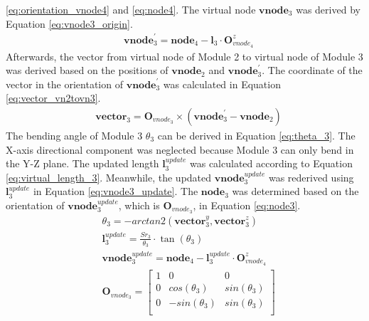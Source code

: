 \begin{itemize}
    \ref{eq:orientation_vnode4} and \ref{eq:node4}. The virtual node $\textbf{vnode}_{3}$ was derived by Equation 
    \ref{eq:vnode3_origin}.
    \vspace{-5mm}
    \begin{align}
        &\textbf{vnode}_{3}^{'} = \textbf{node}_{4} - \textbf{l}_{3} \cdot \textbf{O}_{vnode_4}^{z}
        \label{eq:vnode3_origin}
    \end{align}
    Afterwards, the vector from virtual node of Module 2 to virtual node of Module 3 was derived based on the 
    positions of $\textbf{vnode}_{2}$ and $\textbf{vnode}_{3}^{'}$. The coordinate of the vector in the orientation 
    of $\textbf{vnode}_{3}^{'}$ was calculated in Equation \ref{eq:vector_vn2tovn3}. 
    \vspace{-5mm}
    \begin{align}
        &\textbf{vector}_{3} = \textbf{O}_{vnode_3} \times (\textbf{vnode}_{3}^{'} - \textbf{vnode}_{2}) 
        \label{eq:vector_vn2tovn3} 
    \end{align}
    The bending angle of Module 3 $\theta_3$ can be derived in Equation \ref{eq:theta_3}. The X-axis directional 
    component was neglected because Module 3 can only bend in the Y-Z plane. The updated length $\textbf{l}_{3}^{update}$ 
    was calculated according to Equation \ref{eq:virtual_length_3}. Meanwhile, the updated 
    $\textbf{vnode}_{3}^{update}$ was rederived using $\textbf{l}_{3}^{update}$ in Equation \ref{eq:vnode3_update}. 
    The $\textbf{node}_3$ was determined based on the orientation of $\textbf{vnode}_{3}^{update}$, 
    which is $\textbf{O}_{vnode_3}$, in Equation \ref{eq:node3}.
    \vspace{-5mm}
    \begin{align}
        &\theta_3 = -arctan2(\textbf{vector}_{3}^{y},\textbf{vector}_{3}^{z})
        \label{eq:theta_3} \\
        &\textbf{l}_{3}^{update} = \frac{Sr_3}{\theta_3}\cdot \tan(\theta_3)
        \label{eq:virtual_length_3} \\
        &\textbf{vnode}_{3}^{update} = \textbf{node}_{4} - \textbf{l}_{3}^{update} \cdot \textbf{O}_{vnode_4}^{z}
        \label{eq:vnode3_update} \\
        &\textbf{O}_{vnode_3} =     
        \begin{bmatrix}
            1 & 0 & 0 \\
            0 & cos(\theta_3) & sin(\theta_3) \\
            0 & -sin(\theta_3) & sin(\theta_3) \\

\end{bmatrix}
\end{align}
\end{itemize}

